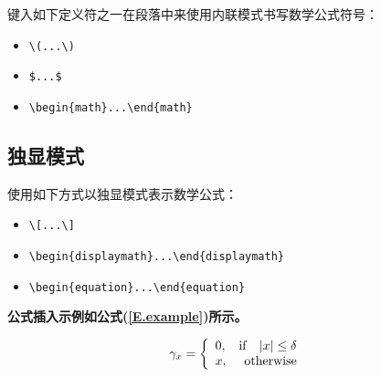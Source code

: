 
键入如下定义符之一在段落中来使用内联模式书写数学公式符号：

\begin{itemize}
    \item \verb|\(...\)|
    \item \verb|$...$|
    \item \verb|\begin{math}...\end{math}|
\end{itemize}

\subsection{独显模式}

使用如下方式以独显模式表示数学公式：

\begin{itemize}
    \item \verb|\[...\]|
    \item \verb|\begin{displaymath}...\end{displaymath}|
    \item \verb|\begin{equation}...\end{equation}|
\end{itemize}

\textbf{公式插入示例如公式(\ref{E.example})所示。}

\begin{equation}
\gamma_{x}=
\left\{
  \begin{array}{lr}
  0, & {\rm if}~~\;|x| \leq \delta \\
  x, & {\rm otherwise}
  \end{array}
\right.
\label{E.example}
\end{equation}


\newpage

